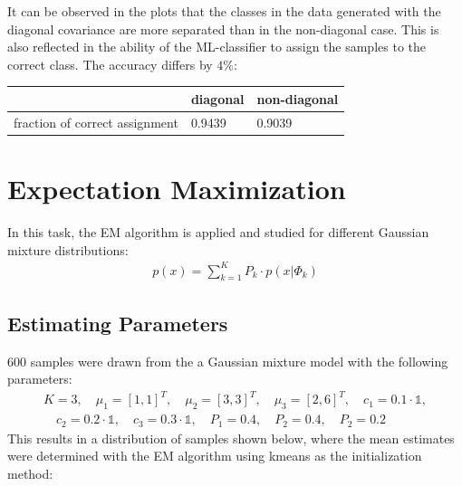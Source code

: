 \documentclass[DIV=12, ngerman, fontsize=12pt, parskip=half]{scrreprt}
\begin{document}
	It can be observed in the plots that the classes in the data generated with the diagonal covariance are more separated than in the non-diagonal case. This is also reflected in the ability of the ML-classifier to assign the samples to the correct class. The accuracy differs by $4\%$:
	
	\begin{table}[H]
	\begin{center}	
		\begin{tabular}{|l|l|l|}
			\hline
			& diagonal & non-diagonal \\
			\hline
			fraction of correct assignment & 0.9439   & 0.9039      \\
			\hline
		\end{tabular}
	\end{center}
	\end{table}

	
	
	{\let\clearpage\relax \chapter{Expectation Maximization}}
	In this task, the EM algorithm is applied and studied for different Gaussian mixture distributions:
	\begin{align*}
		p(x) = \sum_{k=1}^{K}P_k \cdot p(x|\Phi_k)
	\end{align*}

	
	\section{Estimating Parameters}
	600 samples were drawn from the a Gaussian mixture model with the following parameters: 
	\begin{align*}
		K = 3, \quad \mu_1 = [1,1]^T, \quad \mu_2 = [3,3]^T, \quad \mu_3 = [2,6]^T, \quad c_1 = 0.1 \cdot \mathbb{1},\\ \quad c_2 = 0.2 \cdot \mathbb{1}, \quad c_3 = 0.3 \cdot \mathbb{1}, \quad P_1 = 0.4, \quad P_2 = 0.4, \quad P_2 = 0.2
	\end{align*}
	This results in a distribution of samples shown below, where the mean estimates were determined with the EM algorithm using kmeans as the initialization method:
	
\end{document}
